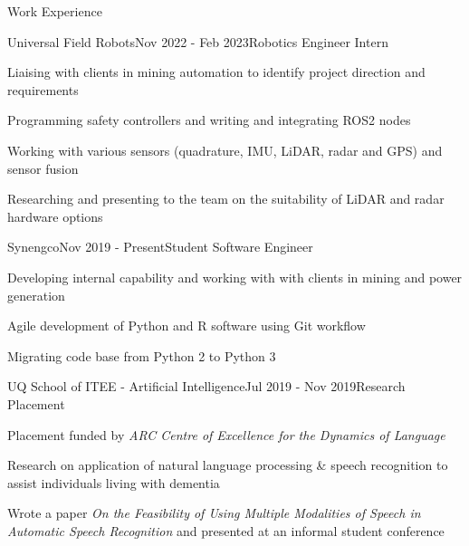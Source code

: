 \documentclass{resume} %
\begin{document}
\vspace{1em}
\begin{rSection}{Work Experience}

\begin{rSubsection}{Universal Field Robots}{Nov 2022 - Feb 2023}{Robotics Engineer Intern}{}
\item Liaising with clients in mining automation to identify project direction and requirements
\item Programming safety controllers and writing and integrating ROS2 nodes
\item Working with various sensors (quadrature, IMU, LiDAR, radar and GPS) and sensor fusion
\item Researching and presenting to the team on the suitability of LiDAR and radar hardware options
\end{rSubsection}


\begin{rSubsection}{Synengco}{Nov 2019 - Present}{Student Software Engineer}{}
\item Developing internal capability and working with with clients in mining and power generation
\item Agile development of Python and R software using Git workflow
\item Migrating code base from Python 2 to Python 3
\end{rSubsection}


\begin{rSubsection}{UQ School of ITEE - Artificial Intelligence}{Jul 2019 - Nov 2019}{Research Placement}{}
\item Placement funded by \textit{ARC Centre of Excellence for the Dynamics of Language}
\item Research on application of natural language processing \& speech recognition to assist individuals living with dementia
\item Wrote a paper \textit{On the Feasibility of Using Multiple Modalities of Speech in Automatic Speech Recognition} and presented at an informal student conference
\end{rSubsection}

\end{rSection}
\end{document}
